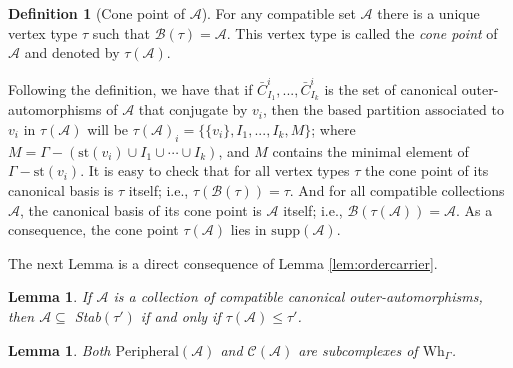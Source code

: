 \documentclass[a4paper]{amsart}
\newcommand{\G}{\Gamma}
\newcommand{\B}{\mathcal{B}}
\newcommand{\au}{\mathcal{A}}
\newcommand{\Wh}{\mathrm{Wh}}
\newcommand{\st}{\mathrm{st}}
\newcommand{\suppa}{\mathrm{supp}(\au)}
\newcommand{\peri}{\mathrm{Peripheral}}
\newtheorem{lem}[teo]{Lemma}
\theoremstyle{definition}
\newtheorem{defi}[teo]{Definition}
\theoremstyle{remark}
\begin{document}
\begin{defi}[Cone point of $\au$]
    For any compatible set $\au$  there is a unique vertex type $\tau$ such that $\B(\tau)=\au$. This vertex type is called the {\sl cone point} of $\au$ and denoted by $\tau(\au)$. \label{def:conePoint}
\end{defi}

Following the definition, we have that if $\bar{C}_{I_1}^i,...,\bar{C}_{I_k}^i$ is the set of canonical outer-automorphisms of $\au$ that conjugate by $v_i$, then the based partition associated to $v_i$ in $\tau(\au)$ will be $\tau(\au)_i=\{\{v_i\},I_1,...,I_k,M\}$; where $M=\G-(\st(v_i)\cup I_1\cup\cdots\cup I_k)$, and $M$ contains the minimal element of $\G-\st(v_i)$.
It is easy to check that for all vertex types $\tau$ the cone point of its canonical basis is $\tau$ itself; i.e., $\tau(\B(\tau))=\tau$. And for all compatible collections $\au$, the canonical basis of its cone point is $\au$ itself; i.e., $\B(\tau(\au))=\au$. As a consequence, the cone point $\tau(\au)$ lies in  $\suppa$.

The next Lemma is a direct consequence of Lemma \ref{lem:ordercarrier}.

\begin{lem}
    If $\au$ is a collection of compatible canonical outer-automorphisms, then  $\au\subseteq$ Stab$(\tau')$ if and only if $\tau(\au)\leq \tau'$.  \label{lem:ordenNuevo}
\end{lem}

\begin{lem}
    Both $\peri(\au)$ and $\mathcal{C}(\au)$ are subcomplexes of $\Wh_\G$.
\end{lem}
\end{document}
